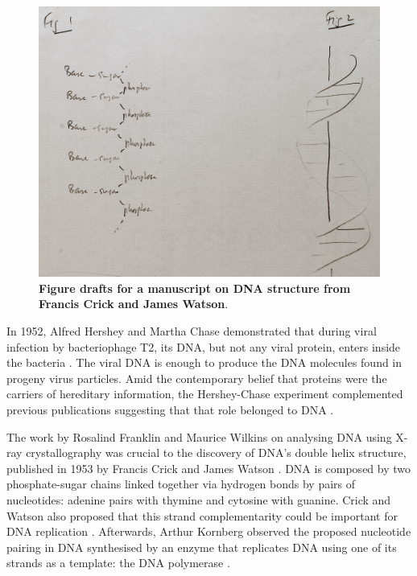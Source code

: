 \begin{figure}
  \vspace{-\intextsep}
  \includegraphics[width=\linewidth]{images/intro/dna_structure_draft_cropped}
  \caption[Figure drafts for a manuscript on DNA structure]{\textbf{Figure drafts for a manuscript on DNA structure from Francis Crick and James Watson}.}
  \label{fig:dna-structure}
  \vspace{-\intextsep}
\end{figure}

In 1952, Alfred Hershey and Martha Chase demonstrated that during viral infection by bacteriophage T2, its DNA, but not any viral protein, enters inside the bacteria \cite{hershey:1952wo}. The viral DNA is enough to produce the DNA molecules found in progeny virus particles. Amid the contemporary belief that proteins were the carriers of hereditary information, the Hershey-Chase experiment complemented previous publications suggesting that that role belonged to DNA \cite{hershey:1952wo}.

The work by Rosalind Franklin and Maurice Wilkins on analysing DNA using X-ray crystallography was crucial to the discovery of DNA's double helix structure, published in 1953 by Francis Crick and James Watson \cite{watson:1953ug}. DNA is composed by two phosphate-sugar chains linked together via hydrogen bonds by pairs of nucleotides: adenine pairs with thymine and cytosine with guanine. Crick and Watson also proposed that this strand complementarity could be important for DNA replication \cite{watson:1953ug}. Afterwards, Arthur Kornberg observed the proposed nucleotide pairing in DNA synthesised by an enzyme that replicates DNA using one of its strands as a template: the DNA polymerase \cite{kornberg:1956wk}.


